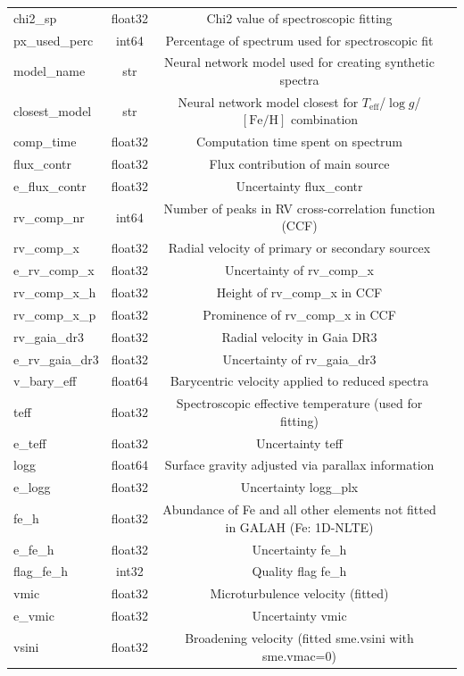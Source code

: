 \documentclass[
  journal=pasa,
  manuscript=research-paper, %
  year=2024,
  volume=37
]{cup-journal}
\newcommand{\Teff}{$T_\mathrm{eff}$\xspace}
\newcommand{\logg}{$\log g$\xspace}
\newcommand{\feh}{$\mathrm{[Fe/H]}$\xspace}
\begin{document}
\begin{table}
\begin{tabular}{lccc}
chi2\_sp	&	float32	&	Chi2 value of spectroscopic fitting	&		\\
px\_used\_perc	&	int64	&	Percentage of spectrum used for spectroscopic fit	&		\\
model\_name	&	str	&	Neural network model used for creating synthetic spectra	&		\\
closest\_model	&	str	&	Neural network model closest for \Teff/\logg/\feh combination	&		\\
comp\_time	&	float32	&	Computation time spent on spectrum	&		\\
flux\_contr	&	float32	&	Flux contribution of main source	&		\\
e\_flux\_contr	&	float32	&	Uncertainty flux\_contr	&		\\
rv\_comp\_nr	&	int64	&	Number of peaks in RV cross-correlation function (CCF)	&		\\
rv\_comp\_x	&	float32	&	Radial velocity of primary or secondary sourcex	&		\\
e\_rv\_comp\_x	&	float32	&	Uncertainty of rv\_comp\_x	&		\\
rv\_comp\_x\_h	&	float32	&	Height of rv\_comp\_x in CCF	&		\\
rv\_comp\_x\_p	&	float32	&	Prominence of rv\_comp\_x in CCF	&		\\
rv\_gaia\_dr3	&	float32	&	Radial velocity in Gaia DR3	&		\\
e\_rv\_gaia\_dr3	&	float32	&	Uncertainty of rv\_gaia\_dr3	&		\\
v\_bary\_eff	&	float64	&	Barycentric velocity applied to reduced spectra	&		\\
teff	&	float32	&	Spectroscopic effective temperature (used for fitting)	&		\\
e\_teff	&	float32	&	Uncertainty teff	&		\\
logg	&	float64	&	Surface gravity adjusted via parallax information	&		\\
e\_logg	&	float32	&	Uncertainty logg\_plx	&		\\
fe\_h	&	float32	&	Abundance of Fe and all other elements not fitted in GALAH (Fe: 1D-NLTE)	&		\\
e\_fe\_h	&	float32	&	Uncertainty fe\_h	&		\\
flag\_fe\_h	&	int32	&	Quality flag fe\_h	&		\\
vmic	&	float32	&	Microturbulence velocity (fitted)	&		\\
e\_vmic	&	float32	&	Uncertainty vmic	&		\\
vsini	&	float32	&	Broadening velocity (fitted sme.vsini with sme.vmac=0)	&		\\

\end{tabular}
\end{table}
\end{document}
